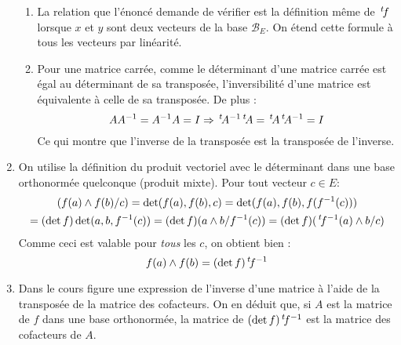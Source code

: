 \begin{enumerate}
\begin{enumerate}
\item La relation que l'énoncé demande de vérifier est la définition même de $\,\mathstrut^t\! f$ lorsque $x$ et $y$ sont deux vecteurs de la base $\mathcal B_E$. On étend cette formule à tous les vecteurs par linéarité.
\item Pour une matrice carrée, comme le déterminant d'une matrice carrée est égal au déterminant de sa transposée, l'inversibilité d'une matrice est équivalente à celle de sa transposée. De plus :
\begin{displaymath}
 A A^{-1} = A^{-1} A =I \Rightarrow
\,\mathstrut^t\! A^{-1} \,\mathstrut^t\! A = \,\mathstrut^t\! A \,\mathstrut^t\! A^{-1} = I
\end{displaymath}
Ce qui montre que l'inverse de la transposée est la transposée de l'inverse.
\end{enumerate}
\item On utilise la définition du produit vectoriel avec le déterminant dans une base orthonormée quelconque (produit mixte). Pour tout vecteur $c\in E$:
\begin{multline*}
 (f(a)\wedge f(b) / c) = \det(f(a),f(b),c) = \det(f(a),f(b),f(f^{-1}(c)))\\
= (\det f) \det(a,b,f^{-1}(c)) 
= (\det f)(a\wedge b/f^{-1}(c)) 
= (\det f)(\,\mathstrut^t\! f^{-1}(a)\wedge b/c)
\end{multline*}
Comme ceci est valable pour \emph{tous} les $c$, on obtient bien :
\begin{displaymath}
 f(a)\wedge f(b) = (\det f)\,\mathstrut^t\! f^{-1}
\end{displaymath}

\item Dans le cours figure une expression de l'inverse d'une matrice à l'aide de la transposée de la matrice des cofacteurs. On en déduit que, si $A$ est la matrice de $f$ dans une base orthonormée, la matrice de $(\det f)\,\mathstrut^t\! f^{-1}$ est la matrice des cofacteurs de $A$. 
\end{enumerate}

